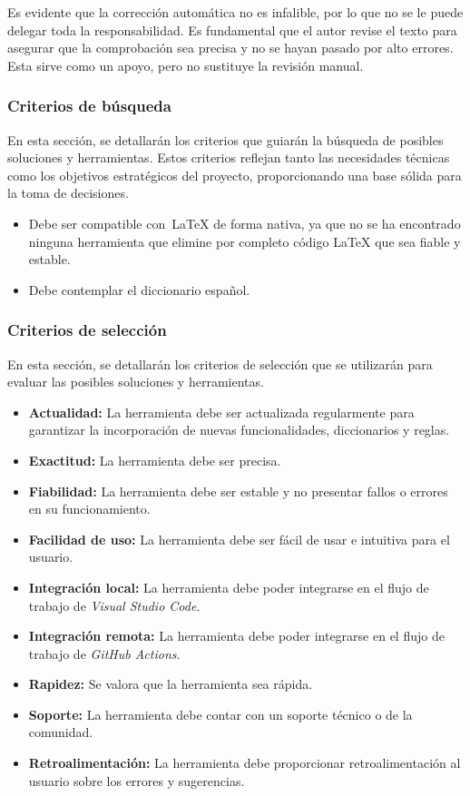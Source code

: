 Es evidente que la corrección automática no es infalible, por lo que no se le puede delegar toda la responsabilidad. Es fundamental que el autor revise el texto para asegurar que la comprobación sea precisa y no se hayan pasado por alto errores. Esta sirve como un apoyo, pero no sustituye la revisión manual.

\subsubsection{Criterios de búsqueda}

En esta sección, se detallarán los criterios que guiarán la búsqueda de posibles soluciones y herramientas. Estos criterios reflejan tanto las necesidades técnicas como los objetivos estratégicos del proyecto, proporcionando una base sólida para la toma de decisiones. 

\begin{itemize}
    \item Debe ser compatible con~\LaTeX{} de forma nativa, ya que no se ha encontrado ninguna herramienta que elimine por completo código \LaTeX{} que sea fiable y estable.
    \item Debe contemplar el diccionario español.
\end{itemize}

\subsubsection{Criterios de selección}

En esta sección, se detallarán los criterios de selección que se utilizarán para evaluar las posibles soluciones y herramientas.

\begin{itemize}
    \item \textbf{Actualidad:} La herramienta debe ser actualizada regularmente para garantizar la incorporación de nuevas funcionalidades, diccionarios y reglas.
    \item \textbf{Exactitud:} La herramienta debe ser precisa.
    \item \textbf{Fiabilidad:} La herramienta debe ser estable y no presentar fallos o errores en su funcionamiento.
    \item \textbf{Facilidad de uso:} La herramienta debe ser fácil de usar e intuitiva para el usuario.
    \item \textbf{Integración local:} La herramienta debe poder integrarse en el flujo de trabajo de \textit{Visual Studio Code}.
    \item \textbf{Integración remota:} La herramienta debe poder integrarse en el flujo de trabajo de \textit{GitHub Actions}.
    \item \textbf{Rapidez:} Se valora que la herramienta sea rápida.
    \item \textbf{Soporte:} La herramienta debe contar con un soporte técnico o de la comunidad.
    \item \textbf{Retroalimentación:} La herramienta debe proporcionar retroalimentación al usuario sobre los errores y sugerencias.
\end{itemize}

